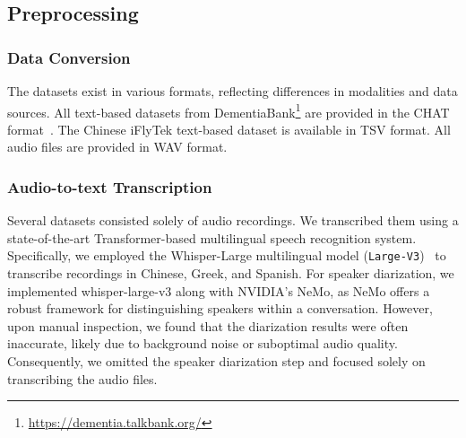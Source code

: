 \subsection{Preprocessing}

\subsubsection{Data Conversion}

The datasets exist in various formats, reflecting differences in modalities and data sources. All text-based datasets from DementiaBank\footnote{\url{https://dementia.talkbank.org/}} are provided in the CHAT format~\cite{macwhinney2017tools}. The Chinese iFlyTek text-based dataset is available in TSV format. All audio files are provided in WAV format.

\subsubsection{Audio-to-text Transcription}

Several datasets consisted solely of audio recordings. We transcribed them using a state-of-the-art Transformer-based multilingual speech recognition system.
Specifically, we employed the Whisper-Large multilingual model (\texttt{Large-V3})~\cite{radford2023robust} to transcribe recordings in Chinese, Greek, and Spanish. For speaker diarization, we implemented whisper-large-v3 along with NVIDIA's NeMo, as NeMo offers a robust framework for distinguishing speakers within a conversation. However, upon manual inspection, we found that the diarization results were often inaccurate, likely due to background noise or suboptimal audio quality. Consequently, we omitted the speaker diarization step and focused solely on transcribing the audio files. 

